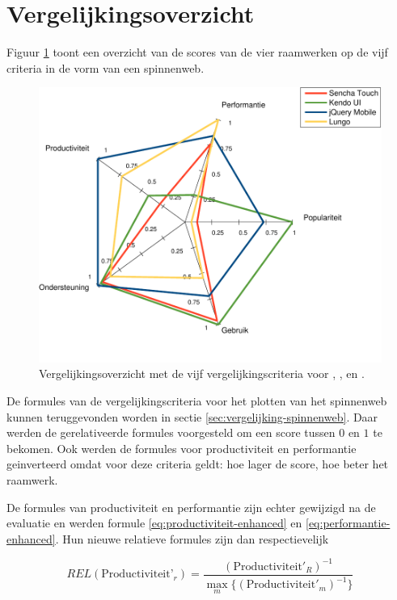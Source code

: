 \section{Vergelijkingsoverzicht}
\label{sec:evaluatie-spinnenweb}

Figuur \ref{fig:spinnenweb-final} toont een overzicht van de scores van de vier raamwerken op de vijf criteria in de vorm van een spinnenweb.

\begin{figure}[H]
  \centering
  \includegraphics[width=\textwidth]{figuren/spidergraph-final-nl.pdf}
  \caption{Vergelijkingsoverzicht met de vijf vergelijkingscriteria voor \st{},  \kendo{},  \jqm{} en \lungo{}.}
  \label{fig:spinnenweb-final}
\end{figure}

De formules van de vergelijkingscriteria voor het plotten van het spinnenweb kunnen teruggevonden worden in sectie \ref{sec:vergelijking-spinnenweb}.
Daar werden de gerelativeerde formules voorgesteld om een score tussen $0$ en $1$ te bekomen.
Ook werden de formules voor productiviteit en performantie geinverteerd omdat voor deze criteria geldt:  hoe lager de score, hoe beter het raamwerk.

De formules van productiviteit en performantie zijn echter gewijzigd na de evaluatie en werden formule \ref{eq:productiviteit-enhanced} en \ref{eq:performantie-enhanced}.
Hun nieuwe relatieve formules zijn dan respectievelijk

\begin{equation}
  REL(\text{Productiviteit'}_r) = \frac{\left(\text{Productiviteit}'_R\right)^{-1}}{\max_{m}\{\left(\text{Productiviteit}'_m\right)^{-1}\}}
  \label{eq:rel-productiviteit-final}
\end{equation}

